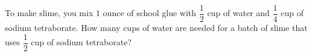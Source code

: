 To make slime, you mix $1$ ounce of school glue with $\dfrac12$ cup of water and $\dfrac14$ cup of sodium tetraborate. How many cups of water are needed for a batch of slime that uses $\dfrac12$ cup of sodium tetraborate?
